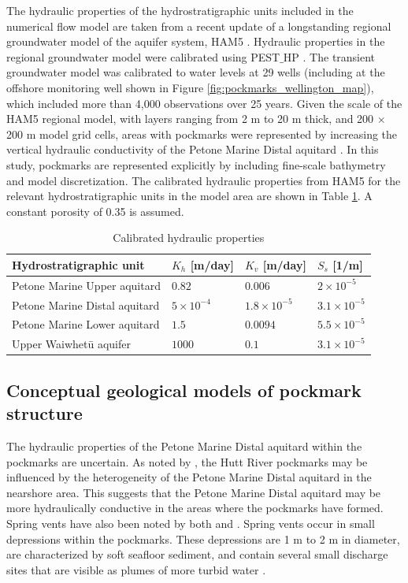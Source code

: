 \documentclass[draft, 10pt]{agujournal2019}
\begin{document}
The hydraulic properties of the hydrostratigraphic units included in the numerical flow model are taken from a recent update of a longstanding regional groundwater model of the aquifer system, HAM5 \cite{bennett_hutt_2024}. Hydraulic properties in the regional groundwater model were calibrated using PEST$\_$HP \cite{doherty_pest_hp_2017}. The transient groundwater model was calibrated to water levels at 29 wells (including at the offshore monitoring well shown in Figure \ref{fig:pockmarks_wellington_map}), which included more than 4,000 observations over 25 years. Given the scale of the HAM5 regional model, with layers ranging from 2 m to 20 m thick, and 200 $\times$ 200 m model grid cells, areas with pockmarks were represented by increasing the vertical hydraulic conductivity of the Petone Marine Distal aquitard \cite{kaleris_modelling_2002}. In this study, pockmarks are represented explicitly by including fine-scale bathymetry and model discretization. The calibrated hydraulic properties from HAM5 for the relevant hydrostratigraphic units in the model area are shown in Table \ref{tab:welly_parameters}. A constant porosity of 0.35 is assumed.

\begin{table}[h!]
\centering
\caption{Calibrated hydraulic properties \cite{bennett_hutt_2024}}
\begin{tabular}{llll}
\hline
Hydrostratigraphic unit & $K_h$ [m/day] & $K_v$ [m/day] & $S_s$ [1/m]  \\
\hline
Petone Marine Upper aquitard & $0.82$& $0.006$  & $2\times 10^{-5}$ \\
Petone Marine Distal aquitard & $5 \times 10^{-4}$& $1.8 \times 10^{-5}$& $3.1\times 10^{-5}$ \\
Petone Marine Lower aquitard & $1.5$& $0.0094$& $5.5\times 10^{-5}$ \\
Upper Waiwhetū aquifer  & $1000$& $0.1$& $3.1\times 10^{-5}$ \\
\hline
\end{tabular}
\label{tab:welly_parameters}
\end{table}

\subsection{Conceptual geological models of pockmark structure}

The hydraulic properties of the Petone Marine Distal aquitard within the pockmarks are uncertain. As noted by , the Hutt River pockmarks may be influenced by the heterogeneity of the Petone Marine Distal aquitard in the nearshore area. This suggests that the Petone Marine Distal aquitard may be more hydraulically conductive in the areas where the pockmarks have formed. Spring vents have also been noted by both  and . Spring vents occur in small depressions within the pockmarks. These depressions are 1 m to 2 m in diameter, are characterized by soft seafloor sediment, and contain several small discharge sites that are visible as plumes of more turbid water \cite{hoffmann_fresh_2023, harding_characteristics_2000}. 
\end{document}
